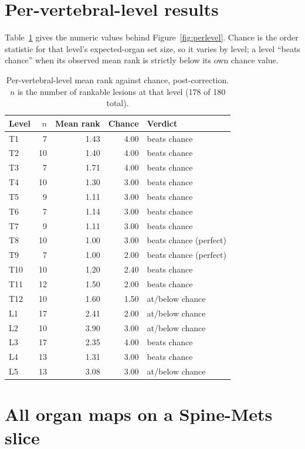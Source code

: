\section{Per-vertebral-level results}
\label{app:perlevel}

Table~\ref{tab:perlevel} gives the numeric values behind
Figure~\ref{fig:perlevel}. Chance is the order statistic for that level's
expected-organ set size, so it varies by level; a level ``beats chance'' when its
observed mean rank is strictly below its own chance value.

\begin{table}[H]
\centering
\caption{Per-vertebral-level mean rank against chance, post-correction. $n$ is
the number of rankable lesions at that level (178 of 180 total).}
\label{tab:perlevel}
\begin{tabular}{lrrrl}
\toprule
Level & $n$ & Mean rank & Chance & Verdict \\
\midrule
T1  &  7 & 1.43 & 4.00 & beats chance \\
T2  & 10 & 1.40 & 4.00 & beats chance \\
T3  &  7 & 1.71 & 4.00 & beats chance \\
T4  & 10 & 1.30 & 3.00 & beats chance \\
T5  &  9 & 1.11 & 3.00 & beats chance \\
T6  &  7 & 1.14 & 3.00 & beats chance \\
T7  &  9 & 1.11 & 3.00 & beats chance \\
T8  & 10 & 1.00 & 3.00 & beats chance (perfect) \\
T9  &  7 & 1.00 & 2.00 & beats chance (perfect) \\
T10 & 10 & 1.20 & 2.40 & beats chance \\
T11 & 12 & 1.50 & 2.00 & beats chance \\
T12 & 10 & 1.60 & 1.50 & at/below chance \\
L1  & 17 & 2.41 & 2.00 & at/below chance \\
L2  & 10 & 3.90 & 3.00 & at/below chance \\
L3  & 17 & 2.35 & 4.00 & beats chance \\
L4  & 13 & 1.31 & 3.00 & beats chance \\
L5  & 13 & 3.08 & 3.00 & at/below chance \\
\bottomrule
\end{tabular}
\end{table}

\section{All organ maps on a Spine-Mets slice}
\label{app:organgrid}

